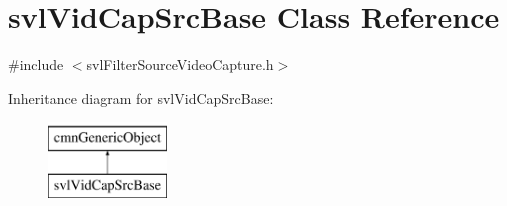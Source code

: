 \hypertarget{classsvl_vid_cap_src_base}{\section{svl\-Vid\-Cap\-Src\-Base Class Reference}
\label{classsvl_vid_cap_src_base}
}


{\ttfamily \#include $<$svl\-Filter\-Source\-Video\-Capture.\-h$>$}

Inheritance diagram for svl\-Vid\-Cap\-Src\-Base\-:\begin{figure}[H]
\begin{center}
\leavevmode
\includegraphics[height=2.000000cm]{db/d61/classsvl_vid_cap_src_base}
\end{center}
\end{figure}
